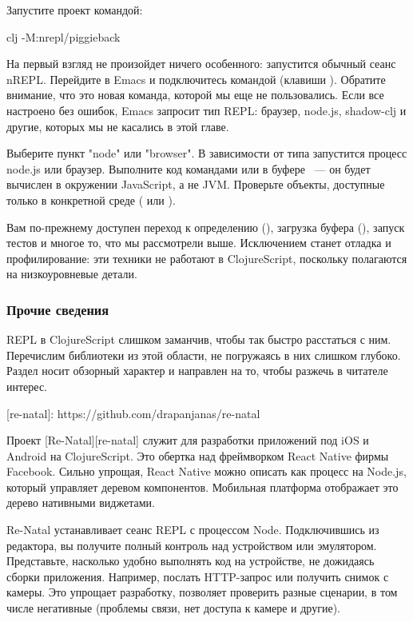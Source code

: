 Запустите проект командой:

\begin{english}
  \begin{bash}
clj -M:nrepl/piggieback
  \end{bash}
\end{english}

На первый взгляд не произойдет ничего особенного: запустится обычный сеанс nREPL. Перейдите в Emacs и подключитесь командой  (клавиши ). Обратите внимание, что это новая команда, которой мы еще не пользовались. Если все настроено без ошибок, Emacs запросит тип REPL: браузер, node.js, shadow-clj и другие, которых мы не касались в этой главе.

Выберите пункт "node" или "browser". В зависимости от типа запустится процесс node.js или браузер. Выполните код командами  или в буфере ~--- он будет вычислен в окружении JavaScript, а не JVM. Проверьте объекты, доступные только в конкретной среде ( или ).

Вам по-прежнему доступен переход к определению (), загрузка буфера (), запуск тестов и многое то, что мы рассмотрели выше. Исключением станет отладка и профилирование: эти техники не работают в ClojureScript, поскольку полагаются на низкоуровневые детали.

\subsubsection{Прочие сведения}

REPL в ClojureScript слишком заманчив, чтобы так быстро расстаться с ним. Перечислим библиотеки из этой области, не погружаясь в них слишком глубоко. Раздел носит обзорный характер и направлен на то, чтобы разжечь в читателе интерес.

[re-natal]: https://github.com/drapanjanas/re-natal

Проект [Re-Natal][re-natal] служит для разработки приложений под iOS и Android на ClojureScript. Это обертка над фреймворком React Native фирмы Facebook. Сильно упрощая, React Native можно описать как процесс на Node.js, который управляет деревом компонентов. Мобильная платформа отображает это дерево нативными виджетами.

Re-Natal устанавливает сеанс REPL с процессом Node. Подключившись из редактора, вы получите полный контроль над устройством или эмулятором. Представьте, насколько удобно выполнять код на устройстве, не дожидаясь сборки приложения. Например, послать HTTP-запрос или получить снимок с камеры. Это упрощает разработку, позволяет проверить разные сценарии, в том числе негативные (проблемы связи, нет доступа к камере и другие).

